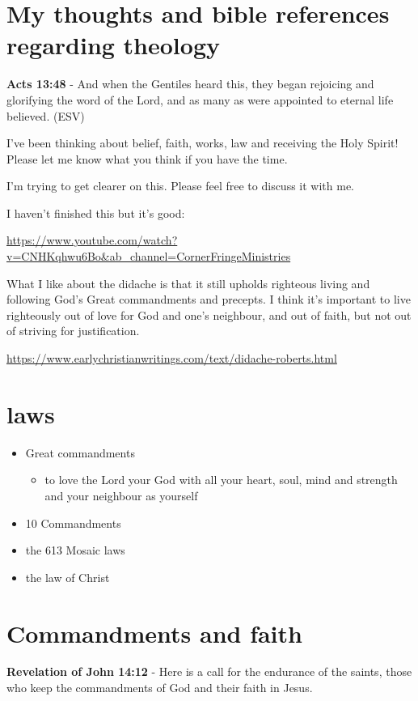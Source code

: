 \documentclass[11pt]{article}
\author{root}
\date{\today}
\title{}
\begin{document}
\section{My thoughts and bible references regarding theology}
\label{sec:orgeb55e1e}
\textbf{Acts 13:48} - And when the Gentiles heard this, they began rejoicing and glorifying the word of the Lord, and as many as were appointed to eternal life believed. (ESV)

I've been thinking about belief, faith, works, law and receiving the Holy Spirit!
Please let me know what you think if you have the time.

I'm trying to get clearer on this.
Please feel free to discuss it with me.

I haven't finished this but it's good:

\url{https://www.youtube.com/watch?v=CNHKqhwu6Bo\&ab\_channel=CornerFringeMinistries}

What I like about the didache is that it still upholds righteous living and following God's Great commandments and precepts.
I think it's important to live righteously out of love for God and one's neighbour, and out of faith, but not out of striving for justification.

\url{https://www.earlychristianwritings.com/text/didache-roberts.html}

\section{laws}
\label{sec:org641d3e0}
\begin{itemize}
\item Great commandments
\begin{itemize}
\item to love the Lord your God with all your heart, soul, mind and strength and your neighbour as yourself
\end{itemize}
\item 10 Commandments
\item the 613 Mosaic laws
\item the law of Christ
\end{itemize}

\section{Commandments and faith}
\label{sec:orgfe10486}
\textbf{Revelation of John 14:12} - Here is a call for the endurance of the saints, those who keep the commandments of God and their faith in Jesus.
\end{document}
